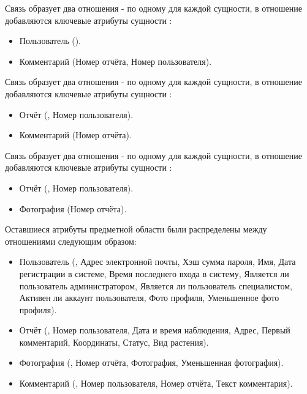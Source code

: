 \tab
Связь  образует два отношения - по одному для каждой сущности, в отношение  добавляются ключевые атрибуты сущности :
\begin{itemize}
	\item Пользователь ().
	\item Комментарий (Номер отчёта, Номер пользователя).
\end{itemize}

\tab
Связь  образует два отношения - по одному для каждой сущности, в отношение  добавляются ключевые атрибуты сущности :
\begin{itemize}
	\item Отчёт (, Номер пользователя).
	\item Комментарий (Номер отчёта).
\end{itemize}

\tab
Связь  образует два отношения - по одному для каждой сущности, в отношение  добавляются ключевые атрибуты сущности :
\begin{itemize}
	\item Отчёт (, Номер пользователя).
	\item Фотография (Номер отчёта).
\end{itemize}

\tab
Оставшиеся атрибуты предметной области были распределены между отношениями следующим образом:
\begin{itemize}
	\item Пользователь (, Адрес электронной почты, Хэш сумма пароля, Имя, Дата регистрации в системе, Время последнего входа в систему, Является ли пользователь администратором, Является ли пользователь специалистом, Активен ли аккаунт пользователя, Фото профиля, Уменьшенное фото профиля).
	\item Отчёт (, Номер пользователя, Дата и время наблюдения, Адрес, Первый комментарий, Координаты, Статус, Вид растения).
	\item Фотография (, Номер отчёта, Фотография, Уменьшенная фотография).
	\item Комментарий (, Номер пользователя, Номер отчёта, Текст комментария).
\end{itemize}

